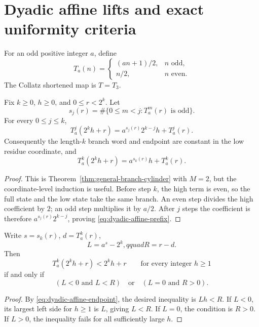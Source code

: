 \section{Dyadic affine lifts and exact uniformity criteria}

For an odd positive integer $a$, define
\[
 T_a(n)=\begin{cases}(an+1)/2,&n\text{ odd},\\n/2,&n\text{ even}.
 \end{cases}
\]
The Collatz shortened map is $T=T_3$.

\begin{theorem}
\label{thm:dyadic-affine-prefix}
Fix $k\ge0$, $h\ge0$, and $0\le r<2^k$.  Let
\[
 s_j(r)=\#\{0\le m<j:T_a^m(r)\text{ is odd}\}.
\]
For every $0\le j\le k$,
\begin{equation}
 T_a^j(2^kh+r)=a^{s_j(r)}2^{k-j}h+T_a^j(r).
 \label{eq:dyadic-affine-prefix}
\end{equation}
Consequently the length-$k$ branch word and endpoint are constant in the
low residue coordinate, and
\begin{equation}
 T_a^k(2^kh+r)=a^{s_k(r)}h+T_a^k(r).
 \label{eq:dyadic-affine-endpoint}
\end{equation}
\end{theorem}

\begin{proof}
This is Theorem~\ref{thm:general-branch-cylinder} with $M=2$, but the
coordinate-level induction is useful.  Before step $k$, the high term is
even, so the full state and the low state take the same branch.  An even step
divides the high coefficient by $2$; an odd step multiplies it by $a/2$.
After $j$ steps the coefficient is therefore
$a^{s_j(r)}2^{k-j}$, proving \eqref{eq:dyadic-affine-prefix}.
\end{proof}

\begin{proposition}
\label{prop:uniform-descent}
Write $s=s_k(r)$, $d=T_a^k(r)$,
\[
 L=a^s-2^k,qquad R=r-d.
\]
Then
\[
 T_a^k(2^kh+r)<2^kh+r\qquad\text{for every integer }h\ge1
\]
if and only if
\begin{equation}
 (L<0\text{ and }L<R)\quad\text{or}\quad(L=0\text{ and }R>0).
 \label{eq:uniform-descent-criterion}
\end{equation}
\end{proposition}

\begin{proof}
By \eqref{eq:dyadic-affine-endpoint}, the desired inequality is
$Lh<R$.  If $L<0$, its largest left side for $h\ge1$ is $L$, giving $L<R$.
If $L=0$, the condition is $R>0$.  If $L>0$, the inequality fails for all
sufficiently large $h$.
\end{proof}

